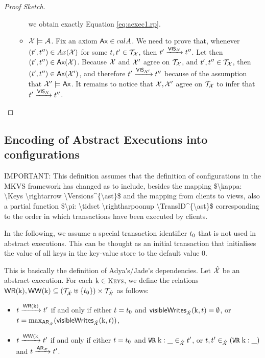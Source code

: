 \begin{proof}[Proof Sketch]
\begin{itemize}
\begin{itemize}
		we obtain exactly Equation \eqref{eq:aexec1.rp}.
		\item $\mathcal{X} \models \mathcal{A}$. Fix an axiom $\mathsf{Ax} \in calA$. We need to prove that, whenever $(t', t'') \in Ax(\mathcal{X})$ for 
		some $t, t' \in \mathcal{T}_{\mathcal{X}}$, then $t' \xrightarrow{{\mathsf{VIS}}_{\mathcal{X}}} t''$. Let then $(t', t'') \in \mathsf{Ax}(\mathcal{X})$. 
		Because $\mathcal{X}$ and $\mathcal{X}'$ agree on $\mathcal{T}_{\mathcal{X}}$, and $t', t'' \in \mathcal{T}_{\mathcal{X}}$, 
		then $(t', t'') \in \mathsf{Ax}(\mathcal{X}')$, and therefore $t' \xrightarrow{{\mathsf{VIS}}_{\mathcal{X}'}} t''$ because of the assumption 
		that $\mathcal{X}' \models \mathsf{Ax}$. It remains to notice that $\mathcal{X}, \mathcal{X}'$ agree on $\mathcal{T}_{\mathcal{X}}$ to infer 
		that $t' \xrightarrow{{\mathsf{VIS}}_{\mathcal{X}}} t''$.
	\end{itemize}
\end{itemize}
\end{proof}

\subsection{Encoding of Abstract Executions into configurations}
\ac{IMPORTANT: This definition assumes that the definition of configurations in the MKVS framework has changed as to include, besides 
the mapping $\kappa: \Keys \rightarrow \Versions^{\ast}$ and the mapping from clients to views, 
also a partial function $\pi: \tidset \rightharpoonup \TransID^{\ast}$ corresponding to the order 
in which transactions have been executed by clients.}

In the following, we assume a special transaction identifier $t_0$ that is not used 
in abstract executions. This can be thought as an initial transaction that initialises the value of all 
keys in the key-value store to the default value $0$.
\begin{definition}
\ac{This is basically the definition of Adya's/Jade's dependencies.}
Let $\hat{\mathcal{X}}$ be an abstract execution. For each $\key{k} \in \Addr$, 
we define the relations ${\mathsf{WR}}(\mathrm{k}), {\mathsf{WW}}(\mathrm{k}) \subseteq (\mathcal{T}_{\hat{\mathcal{X}}} \uplus \{t_0\}) \times 
\mathcal{T}_{\hat{\mathcal{X}}}$ as follows: 
\begin{itemize}
\item $t \xrightarrow{{\mathsf{WR}}(\mathrm{k})} t'$ if and only if either $t = t_0$ and 
$\mathsf{visibleWrites}_{\hat{\mathcal{X}}}(\mathrm{k}, t) = \emptyset$, or 
$t = \max_{{\sf{AR}}_{\hat{\mathcal{X}}}}(\mathsf{visibleWrites}_{\hat{\mathcal{X}}}(\mathrm{k}, t))$, 
\item $t \xrightarrow{{\mathsf{WW}}(\mathrm{k}} t'$ if and only if either $t = t_0$ 
and ${{\tt WR}}\;\mathrm{k}: \_ \in_{\hat{\mathcal{X}}} t'$, or $t, t' \in_{\hat{\mathcal{X}}} ({{\tt WR}}\;\mathrm{k}: \_)$ 
and $t \xrightarrow{{\sf{AR}}_{\mathcal{X}}} t'$.
\end{itemize}
\end{definition}

